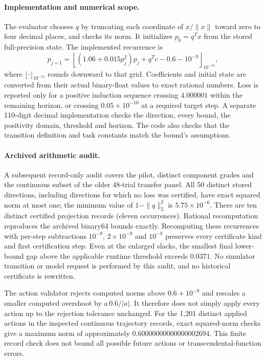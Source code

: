 \paragraph{Implementation and numerical scope.}
The evaluator chooses $q$ by truncating each coordinate of $x/\|x\|$ toward zero to four decimal places, and checks its norm. It initializes $p_0=q^Tx$ from the stored full-precision state. The implemented recurrence is
\begin{equation}
p_{j+1}=\left\lfloor (1.06+0.015p_j^2)p_j+q^Tc-0.6-10^{-9}\right\rfloor_{10^{-12}},
\end{equation}
where $\lfloor\cdot\rfloor_{10^{-12}}$ rounds downward to that grid. Coefficients and initial state are converted from their actual binary-float values to exact rational numbers. Loss is reported only for a positive induction sequence crossing $4.000001$ within the remaining horizon, or crossing $0.05+10^{-10}$ at a required target step. A separate 110-digit decimal implementation checks the direction, every bound, the positivity domain, threshold and horizon. The code also checks that the transition definition and task constants match the bound's assumptions.

\paragraph{Archived arithmetic audit.}
A subsequent record-only audit covers the pilot, distinct component
grades and the continuous subset of the older 48-trial transfer panel. All 50 distinct
stored directions, including directions for which no loss was certified,
have exact squared norm at most one; the minimum value of
$1-\|q\|_2^2$ is $5.75\times10^{-6}$. There are ten distinct certified
projection records (eleven occurrences). Rational recomputation reproduces
the archived binary64 bounds exactly. Recomputing these recurrences with per-step
subtractions $10^{-9}$, $2\times10^{-9}$ and $10^{-8}$ preserves every
certificate kind and first certification step. Even at the enlarged
slacks, the smallest final lower-bound gap above the applicable runtime
threshold exceeds $0.0371$. No simulator transition or model request is
performed by this audit, and no historical certificate is rewritten.

The action validator rejects computed norms above $0.6+10^{-9}$ and
rescales a smaller computed overshoot by $a\,0.6/|a|$. It therefore does
not simply apply every action up to the rejection tolerance unchanged.
For the 1,201 distinct applied actions in the inspected continuous
trajectory records, exact squared-norm checks give a maximum norm of
approximately $0.60000000000000002694$. This finite record check does not
bound all possible future actions or transcendental-function errors.

